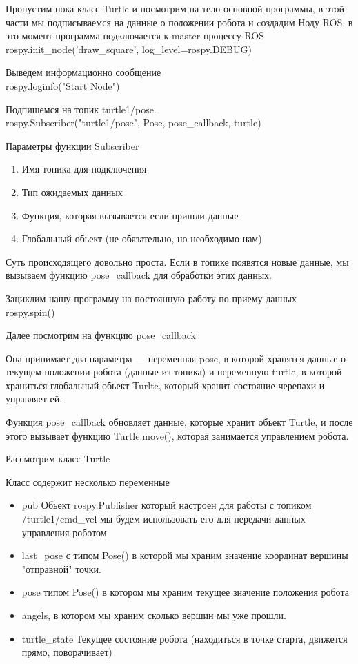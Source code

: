 Пропустим пока класс Turtle и посмотрим на тело основной программы, в этой части мы подписываемся на данные о положении робота и cоздадим Ноду ROS, в это момент программа подключается к master процессу ROS\\
rospy.init\_node('draw\_square', log\_level=rospy.DEBUG)

Выведем информационно сообщение\\
rospy.loginfo("Start Node")

Подпишемся на топик turtle1/pose.\\
rospy.Subscriber("turtle1/pose", Pose, pose\_callback, turtle)

Параметры функции Subscriber
\begin{enumerate}
    \item Имя топика для подключения
    \item Тип ожидаемых данных
    \item Функция, которая вызывается если пришли данные
    \item Глобальный обьект (не обязательно, но необходимо нам)
\end{enumerate}

Суть происходящего довольно проста. Если в топике появятся новые данные, мы вызываем функцию pose\_callback для обработки этих данных.

Зациклим нашу программу на постоянную работу по приему данных\\
rospy.spin()

Далее посмотрим на функцию pose\_callback

Она принимает два параметра — переменная pose, в которой хранятся данные о текущем положении робота (данные из топика) и переменную turtle, в которой храниться глобальный обьект Turlte, который хранит состояние черепахи и управляет ей.

Функция pose\_callback обновляет данные, которые хранит обьект Turtle, и после этого вызывает функцию Turtle.move(), которая занимается управлением робота.

Рассмотрим класс Turtle

Класс содержит несколько переменные
\begin{itemize}
    \item pub Обьект rospy.Publisher который настроен для работы с топиком \linebreak /turtle1/cmd\_vel мы будем использовать его для передачи данных управления роботом
    \item last\_pose с типом Pose() в которой мы храним значение координат вершины "отправной" точки.
    \item pose типом Pose() в котором мы храним текущее значение положения робота
    \item angels, в котором мы храним сколько вершин мы уже прошли.
    \item turtle\_state Текущее состояние робота (находиться в точке старта, движется прямо, поворачивает)
\end{itemize}

